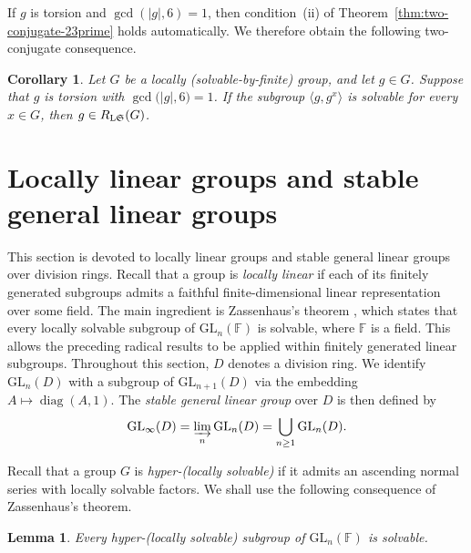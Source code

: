 \documentclass[11pt, reqno]{amsart}
\numberwithin{equation}{section}
\newtheorem{lemma}[theorem]{Lemma}
\newtheorem{corollary}[theorem]{Corollary}
\theoremstyle{definition}
\numberwithin{equation}{section}
\begin{document}
If $g$ is torsion and $\gcd(|g|,6)=1$, then condition~\textup{(ii)} of
Theorem~\ref{thm:two-conjugate-23prime} holds automatically.  We therefore
obtain the following two-conjugate consequence.

\begin{corollary}\label{cor:two_conj_torsion}
Let $G$ be a locally \textup{(}solvable-by-finite\textup{)} group, and let $g \in G$. Suppose that $g$ is torsion with $\gcd \bigl(|g|,6 \bigr)=1$. If the subgroup $\langle g, g^x \rangle$ is solvable for every $x \in G$, then $g \in R_{\textup{L}\mathfrak{S}}(G)$.
\end{corollary}

\section{Locally linear groups and stable general linear groups}

This section is devoted to locally linear groups and stable general linear groups over division rings. Recall that a group is \emph{locally linear} if each of its finitely generated subgroups admits a faithful finite-dimensional linear representation over some field. The main ingredient is Zassenhaus's theorem \cite[Satz~8]{Zassenhaus1938}, which states that every locally solvable subgroup of $\mathrm{GL}_n(\mathbb F)$ is solvable, where $\mathbb F$ is a field. This allows the preceding radical results to be applied within finitely generated linear subgroups. Throughout this section, $D$ denotes a division ring. We identify $\mathrm{GL}_n(D)$ with a subgroup of $\mathrm{GL}_{n+1}(D)$ via the embedding $A\longmapsto \operatorname{diag}(A,1).$ The \emph{stable general linear group} over $D$ is then defined by
  $$\mathrm{GL}_{\infty}(D) = \varinjlim_{n}\mathrm{GL}_n(D) = \bigcup_{n\geq 1}\mathrm{GL}_n(D).$$

Recall that a group $G$ is \emph{hyper-\textup{(}locally solvable\textup{)}} if it admits an ascending normal series with locally solvable factors. We shall use the following consequence of Zassenhaus's theorem.

\begin{lemma}
\label{lem:radlinearissol}
Every hyper-\textup{(}locally solvable\textup{)} subgroup of
$\mathrm{GL}_n(\mathbb F)$ is solvable.
\end{lemma}
\end{document}
